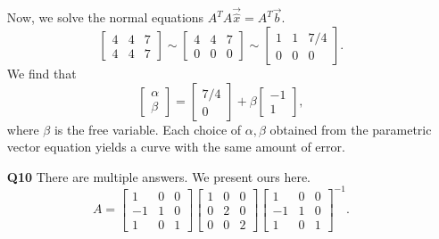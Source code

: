 \begin{enumerate}
					Now, we solve the normal equations \(A^TA\vec{\hat{x}} = A^T\vec{b}.\) 
					\[\left[\!\!\begin{array}{cc|c}4 & 4 & 7 \\ 4 & 4 & 7\end{array}\!\!\right]
					  \sim \left[\!\!\begin{array}{cc|c}4 & 4 & 7 \\ 0 & 0 & 0\end{array}\!\!\right] 
					  \sim \left[\!\!\begin{array}{cc|c}1 & 1 & 7/4 \\ 0 & 0 & 0\end{array}\!\!\right].\]
					We find that \[\begin{bmatrix}\alpha \\ \beta\end{bmatrix} = \begin{bmatrix}7/4 \\ 0\end{bmatrix} 
					+ \beta\begin{bmatrix}-1 \\ 1\end{bmatrix},\] where \(\beta\) is the free variable. Each choice of \(\alpha, \beta\) obtained from the
					parametric vector equation yields a curve with the same amount of error.

	\item[\textbf{Q10}] There are multiple answers. We present ours here.
					\[A = \begin{bmatrix}1 & 0 & 0 \\ -1 & 1 & 0 \\ 1 & 0 & 1\end{bmatrix}\begin{bmatrix}1 & 0 & 0 \\ 0 & 2 & 0 \\ 0 & 0 & 2\end{bmatrix}\begin{bmatrix}1 & 0 & 0 \\ -1 & 1 & 0 \\ 1 & 0 & 1\end{bmatrix}^{-1}.\]
\end{enumerate}